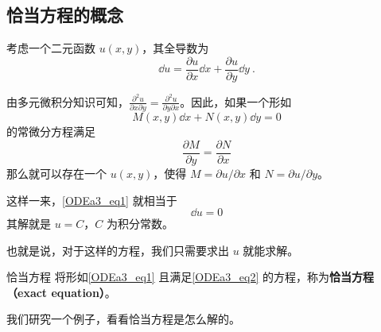

\subsection{恰当方程的概念}

考虑一个二元函数 $u(x, y)$，其全导数为
\begin{equation}
\dd u=\frac{\partial u}{\partial x}\dd x+\frac{\partial u}{\partial y}\dd y~.
\end{equation}

由多元微积分知识可知，$\frac{\partial^2 u}{\partial x\partial y}=\frac{\partial^2 u}{\partial y\partial x}$。因此，如果一个形如
\begin{equation}\label{ODEa3_eq1}
M(x, y)\dd x+N(x, y)\dd y=0
\end{equation}
的常微分方程满足
\begin{equation}\label{ODEa3_eq2}
\frac{\partial M}{\partial y}=\frac{\partial N}{\partial x}
\end{equation}
那么就可以存在一个 $u(x, y)$，使得 $M=\partial u/\partial x$ 和 $N=\partial u/\partial y$。

这样一来，\autoref{ODEa3_eq1} 就相当于
\begin{equation}
\dd u=0
\end{equation}
其解就是 $u=C$，$C$ 为积分常数。

也就是说，对于这样的方程，我们只需要求出 $u$ 就能求解。

\begin{definition}{恰当方程}
将形如\autoref{ODEa3_eq1} 且满足\autoref{ODEa3_eq2} 的方程，称为\textbf{恰当方程（exact equation）}。
\end{definition}

我们研究一个例子，看看恰当方程是怎么解的。


